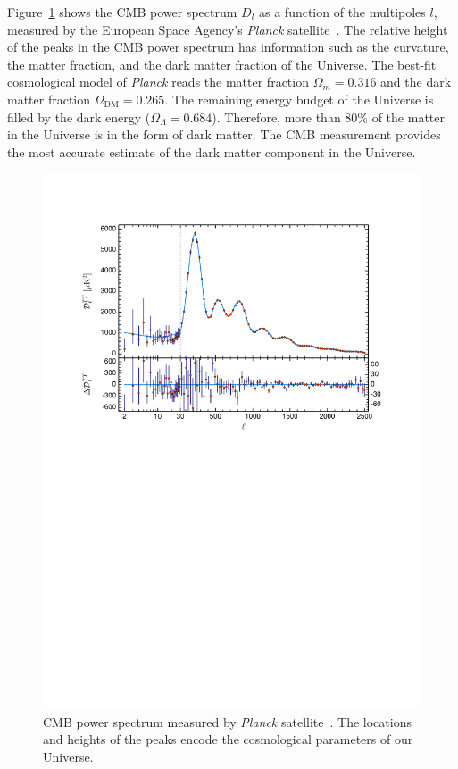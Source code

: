 \documentclass[doublespace,nopageskip]{VTthesis} %
\begin{document}
Figure~\ref{fig:cmb} shows the CMB power spectrum $D_l$ as a function of the multipoles $l$, measured by the European Space Agency's \emph{Planck} satellite~\cite{2020A&A...641A...6P}. The relative height of the peaks in the CMB power spectrum has information such as the curvature, the matter fraction, and the dark matter fraction of the Universe. The best-fit cosmological model of \textit{Planck} reads the matter fraction $\Omega_m = 0.316$ and the dark matter fraction $\Omega_\mathrm{DM} = 0.265$. The remaining energy budget of the Universe is filled by the dark energy ($\Omega_\Lambda = 0.684$). Therefore, more than 80\% of the matter in the Universe is in the form of dark matter. The CMB measurement provides the most accurate estimate of the dark matter component in the Universe.
\begin{figure}[htb]
    \centering
    \includegraphics[width=\textwidth]{Figures/Intro/Planck_CMB.pdf}
    \caption{CMB power spectrum measured by \emph{Planck} satellite~\cite{2020A&A...641A...6P}. The locations and heights of the peaks encode the cosmological parameters of our Universe.}
    \label{fig:cmb}
\end{figure}
\end{document}
